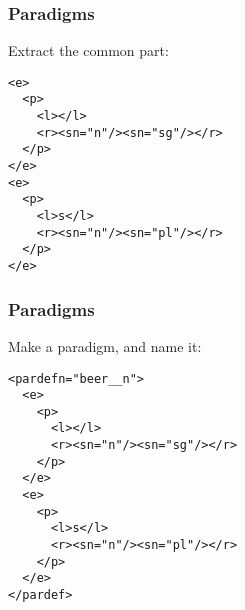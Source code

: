 \documentclass{beamer} %
\begin{document}
\begin{frame}
  \frametitle{Paradigms}

  \begin{exampleblock}{Extract the common part:}
    \begin{footnotesize}
    \begin{alltt}
      <e> \\
      ~~<p> \\
      ~~~~<l></l> \\
      ~~~~<r><s n="n"/><s n="sg"/></r> \\
      ~~</p> \\
      </e> \\
      <e> \\
      ~~<p> \\
      ~~~~<l>s</l> \\
      ~~~~<r><s n="n"/><s n="pl"/></r> \\
      ~~</p> \\
      </e>
    \end{alltt}
    \end{footnotesize}
\end{exampleblock}
\end{frame}

\begin{frame}
  \frametitle{Paradigms}

  \begin{exampleblock}{Make a paradigm, and name it:}
    \begin{footnotesize}
    \begin{alltt}
      <pardef n="beer\_\_n"> \\
      ~~<e> \\
      ~~~~<p> \\
      ~~~~~~<l></l> \\
      ~~~~~~<r><s n="n"/><s n="sg"/></r> \\
      ~~~~</p> \\
      ~~</e> \\
      ~~<e> \\
      ~~~~<p> \\
      ~~~~~~<l>s</l> \\
      ~~~~~~<r><s n="n"/><s n="pl"/></r> \\
      ~~~~</p> \\
      ~~</e> \\
      </pardef>
    \end{alltt}
    \end{footnotesize}
\end{exampleblock}
\end{frame}
\end{document}
